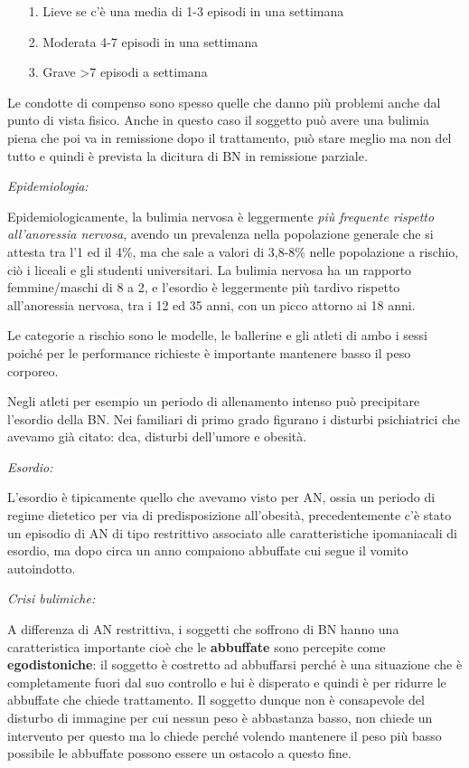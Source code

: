 \begin{itemize}
\item[1.]
  Lieve se c'è una media di 1-3 episodi in una settimana
\item[2.]
  Moderata 4-7 episodi in una settimana
\item[3.]
  Grave \textgreater{}7 episodi a settimana
\end{itemize}

Le condotte di compenso sono spesso quelle che danno più problemi anche
dal punto di vista fisico. Anche in questo caso il soggetto può avere
una bulimia piena che poi va in remissione dopo il trattamento, può
stare meglio ma non del tutto e quindi è prevista la dicitura di BN in
remissione parziale.

\emph{\emph{Epidemiologia: }}

Epidemiologicamente, la bulimia nervosa è leggermente \emph{più
frequente rispetto all'anoressia nervosa}, avendo un prevalenza nella
popolazione generale che si attesta tra l'1 ed il 4\%, ma che sale a
valori di 3,8-8\% nelle popolazione a rischio, ciò i liceali e gli
studenti universitari. La bulimia nervosa ha un rapporto femmine/maschi
di 8 a 2, e l'esordio è leggermente più tardivo rispetto all'anoressia
nervosa, tra i 12 ed 35 anni, con un picco attorno ai 18 anni.

Le categorie a rischio sono le modelle, le ballerine e gli atleti di
ambo i sessi poiché per le performance richieste è importante mantenere
basso il peso corporeo.

Negli atleti per esempio un periodo di allenamento intenso può
precipitare l'esordio della BN. Nei familiari di primo grado figurano i
disturbi psichiatrici che avevamo già citato: dca, disturbi dell'umore e
obesità.

\emph{\emph{Esordio:}}

L'esordio è tipicamente quello che avevamo visto per AN, ossia un
periodo di regime dietetico per via di predisposizione all'obesità,
precedentemente c'è stato un episodio di AN di tipo restrittivo
associato alle caratteristiche ipomaniacali di esordio, ma dopo circa un
anno compaiono abbuffate cui segue il vomito autoindotto.

\emph{\emph{Crisi bulimiche:}}

A differenza di AN restrittiva, i soggetti che soffrono di BN hanno una
caratteristica importante cioè che le \textbf{abbuffate} sono percepite
come \textbf{egodistoniche}: il soggetto è costretto ad abbuffarsi
perché è una situazione che è completamente fuori dal suo controllo e
lui è disperato e quindi è per ridurre le abbuffate che chiede
trattamento. Il soggetto dunque non è consapevole del disturbo di
immagine per cui nessun peso è abbastanza basso, non chiede un
intervento per questo ma lo chiede perché volendo mantenere il peso più
basso possibile le abbuffate possono essere un ostacolo a questo fine.

